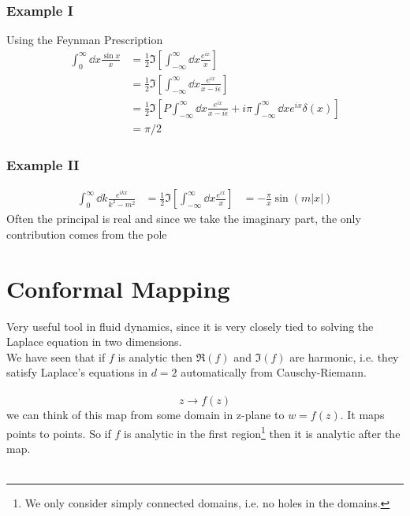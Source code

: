 \documentclass[a4paper,12pt]{article}
\begin{document}
\subsubsection{Example I}
Using the Feynman Prescription
\begin{equation}
\begin{aligned}
 \int_{0}^{\infty} \dd x\frac{\sin x}{x} &=\frac{1}{2}\Im\left[ \int_{-\infty}^{\infty} \dd x\frac{e^{ix}}{x}\right]\\
 &=\frac{1}{2}\Im\left[ \int_{-\infty}^{\infty} \dd x\frac{e^{ix}}{x-i\epsilon}\right]\\
  &=\frac{1}{2}\Im\left[P \int_{-\infty}^{\infty} \dd x\frac{e^{ix}}{x-i\epsilon}+i\pi \int_{-\infty}^{\infty} \dd x e^{ix}\delta(x)\right]\\
  &=\pi/2
\end{aligned}
\end{equation}
\subsubsection{Example II}
\begin{equation}
	\begin{aligned}
		\int_{0}^{\infty} \dd k\frac{e^{ikx}}{k^2-m^2} &=\frac{1}{2}\Im\left[ \int_{-\infty}^{\infty} \dd x\frac{e^{ix}}{x}\right]
		&=-\frac{\pi}{x}\sin(m|x|)
	\end{aligned}
\end{equation}
Often the principal is real and since we take the imaginary part, the only contribution comes from the pole 
\section{Conformal Mapping}
Very useful tool in fluid dynamics, since it is very closely tied to solving the Laplace equation in two dimensions.\\
We have seen that if $f$ is analytic then $\Re(f)$ and $\Im (f)$ are harmonic, i.e. they satisfy Laplace's equations in $d=2$ automatically from Causchy-Riemann.
\\\\
\begin{equation}
z\to f(z)
\end{equation}
we can think of this map from some domain in z-plane to $w=f(z)$. It maps points to points. So if $f$ is analytic in the first region\footnote{We only consider simply connected domains, i.e. no holes in the domains.} then it is analytic after the map.
\\\\
\end{document}
